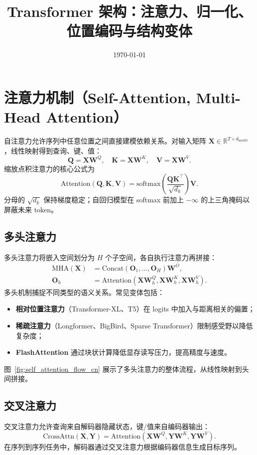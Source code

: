 \documentclass[UTF8,zihao=-4]{ctexart}
\title{Transformer 架构：注意力、归一化、位置编码与结构变体}
\author{}
\date{\today}
\begin{document}
\maketitle

\section{注意力机制（Self-Attention, Multi-Head Attention）}
自注意力允许序列中任意位置之间直接建模依赖关系。对输入矩阵 $\mathbf{X} \in \mathbb{R}^{T \times d_{\text{model}}}$，线性映射得到查询、键、值：
\begin{equation}
  \mathbf{Q} = \mathbf{X}\mathbf{W}^Q,\quad \mathbf{K} = \mathbf{X}\mathbf{W}^K,\quad \mathbf{V} = \mathbf{X}\mathbf{W}^V.
\end{equation}
缩放点积注意力的核心公式为
\begin{equation}
  \mathrm{Attention}(\mathbf{Q}, \mathbf{K}, \mathbf{V}) = \mathrm{softmax}\left( \frac{\mathbf{Q}\mathbf{K}^{\top}}{\sqrt{d_k}} \right)\mathbf{V}.
\end{equation}
分母的 $\sqrt{d_k}$ 保持梯度稳定；自回归模型在 softmax 前加上 $-\infty$ 的上三角掩码以屏蔽未来 token。

\subsection{多头注意力}
多头注意力将嵌入空间划分为 $H$ 个子空间，各自执行注意力再拼接：
\begin{align}
  \mathrm{MHA}(\mathbf{X}) &= \mathrm{Concat}(\mathbf{O}_1, \ldots, \mathbf{O}_H)\mathbf{W}^O, \\
  \mathbf{O}_h &= \mathrm{Attention}\left(\mathbf{X}\mathbf{W}_h^Q, \mathbf{X}\mathbf{W}_h^K, \mathbf{X}\mathbf{W}_h^V\right).
\end{align}
多头机制捕捉不同类型的语义关系。常见变体包括：
\begin{itemize}
  \item \textbf{相对位置注意力}（Transformer-XL、T5）在 logits 中加入与距离相关的偏置；
  \item \textbf{稀疏注意力}（Longformer、BigBird、Sparse Transformer）限制感受野以降低复杂度；
  \item \textbf{FlashAttention} 通过块状计算降低显存读写压力，提高精度与速度。
\end{itemize}
图~\ref{fig:self_attention_flow_cn} 展示了多头注意力的整体流程，从线性映射到头间拼接。

\subsection{交叉注意力}
交叉注意力允许查询来自解码器隐藏状态，键/值来自编码器输出：
\begin{equation}
  \mathrm{CrossAttn}(\mathbf{X}, \mathbf{Y}) = \mathrm{Attention}(\mathbf{X}\mathbf{W}^Q, \mathbf{Y}\mathbf{W}^K, \mathbf{Y}\mathbf{W}^V).
\end{equation}
在序列到序列任务中，解码器通过交叉注意力根据编码器信息生成目标序列。
\end{document}
